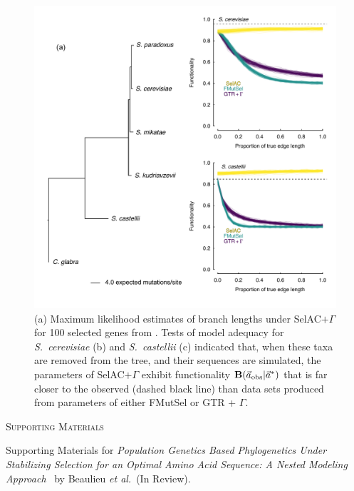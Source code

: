 \documentclass[12pt,letterpaper,fleqn]{article}
\renewcommand{\section}[1]{%
\bigskip
\begin{center}
\begin{Large}
\normalfont\scshape #1
\medskip
\end{Large}
\end{center}}
\newcommand{\Funcaobsvec}{\ensuremath{\Func(\aobsvec|\aoptvec)}\xspace}
\newcommand{\Func}{\ensuremath{\text{\textbf{B}}}\xspace}
\newcommand{\selacplusgamma}{SelAC$+\Gamma$\xspace}
\newcommand{\aobsvec}{\ensuremath{\Vec{a}_{\text{obs}}}\xspace}
\newcommand{\aoptvec}{\ensuremath{\Vec{a}^*}\xspace}
\begin{document}
\begin{figure}[H]
  \centering
  \includegraphics[width=0.9\linewidth]{FIGURE_3_Inferred_Tree_AND_Model_Adequacy.pdf}
  \caption{(a) Maximum likelihood estimates of branch lengths under \selacplusgamma for 100 selected genes from \citet{SalichosAndRokas2013}.
    Tests of model adequacy for \emph{S.~cerevisiae} (b) and \emph{S.~castellii} (c) indicated that, when these taxa are removed from the tree, and their sequences are simulated, the parameters of \selacplusgamma exhibit functionality \Funcaobsvec that is far closer to the observed (dashed black line) than data sets produced from parameters of either FMutSel or GTR + $\Gamma$.
}
  \label{fig:TreeAndAdequacy}
\end{figure}


\clearpage

\setcounter{figure}{0}
\setcounter{table}{0}
\setcounter{page}{1}
\setcounter{section}{0}

\renewcommand{\thefigure}{S\arabic{figure}}
\renewcommand{\thetable}{S\arabic{table}}
\renewcommand{\thepage}{S\arabic{page}}
\renewcommand{\thesection}{\arabic{section}} %
\renewcommand{\appendixname}{Supporting Materials}
\renewcommand{\theequation}{S\arabic{equation}}

\setcounter{equation}{0}
\appendix



\section{Supporting Materials}
Supporting Materials for \emph{Population Genetics Based Phylogenetics Under Stabilizing Selection for an Optimal Amino Acid Sequence: A Nested Modeling Approach} \ by Beaulieu \emph{et al.}~(In Review).
\end{document}
